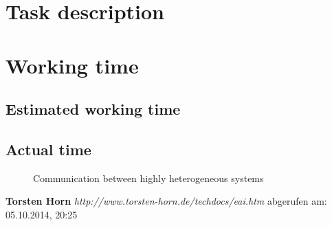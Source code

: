 \documentclass[a4paper]{article}
\begin{document}
\tableofcontents

\newpage

\section{Task description}

\section{Working time}
\subsection{Estimated working time}
\subsection{Actual time}

 \begin{figure}[here!]
	\centering
	\caption{Communication between highly heterogeneous systems \cite{muede}}
	\label{fig:anfang}
	\end{figure}
\newpage
\printglossaries
\listoffigures
\newpage
\begin{thebibliography}{56}

   \textbf{Torsten Horn}\newline
  \emph{http://www.torsten-horn.de/techdocs/eai.htm}
  \newline abgerufen am: 05.10.2014, 20:25


\end{thebibliography}
\end{document}
